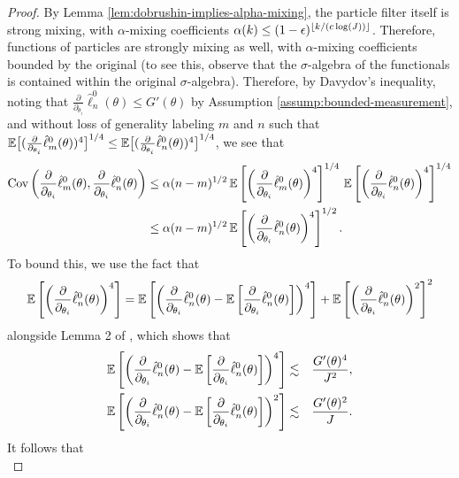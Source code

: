 \begin{proof}
By Lemma \ref{lem:dobrushin-implies-alpha-mixing}, the particle filter itself is strong mixing, with $\alpha$-mixing coefficients $\alpha(k) \leq (1-\epsilon)^{\lfloor k/(c\log(J)) \rfloor}$. Therefore, functions of particles are strongly mixing as well, with $\alpha$-mixing coefficients bounded by the original (to see this, observe that the $\sigma$-algebra of the functionals is contained within the original $\sigma$-algebra). Therefore, by Davydov's inequality, noting that $\frac{\partial}{\partial_{\theta_i}}\hat\ell_n^0(\theta)\leq G'(\theta)$ by Assumption \ref{assump:bounded-measurement}, and without loss of generality labeling $m$ and $n$ such that $\mathbb{E}\big[(\frac{\partial}{\partial_{\theta_i}}\hat\ell_m^0(\theta))^4\big]^{1/4}\leq\mathbb{E}\big[(\frac{\partial}{\partial_{\theta_i}}\hat\ell_n^0(\theta))^4\big]^{1/4}$, we see that
\begin{align}
    \mathrm{Cov}\left(\frac{\partial}{\partial_{\theta_i}}\hat\ell_m^0(\theta), \frac{\partial}{\partial_{\theta_i}}\hat\ell_n^0(\theta)\right) 
    &\leq \alpha(n-m)^{1/2} \, \mathbb{E}\left[\left(\frac{\partial}{\partial_{\theta_i}}\hat\ell_m^0(\theta)\right)^4\right]^{1/4}
    \,
    \mathbb{E}\left[\left(\frac{\partial}{\partial_{\theta_i}}\hat\ell_n^0(\theta)\right)^4\right]^{1/4}\\
    &\leq \alpha(n-m)^{1/2}\, \mathbb{E}\left[\left(\frac{\partial}{\partial_{\theta_i}}\hat\ell_n^0(\theta)\right)^4\right]^{1/2}.
\end{align}
To bound this, we use the fact that 
\begin{equation}
\mathbb{E}\left[\left(\frac{\partial}{\partial_{\theta_i}}\hat\ell_n^0(\theta)\right)^4\right] = \mathbb{E}\left[\left(\frac{\partial}{\partial_{\theta_i}}\hat\ell_n^0(\theta)-\mathbb{E}\left[\frac{\partial}{\partial_{\theta_i}}\hat\ell_n^0(\theta)\right]\right)^4\right]+\mathbb{E}\left[\left(\frac{\partial}{\partial_{\theta_i}}\hat\ell_n^0(\theta)\right)^2\right]^2
\end{equation}
alongside Lemma 2 of \cite{karjalainen23}, which shows that
\begin{eqnarray}
\mathbb{E}\left[\left(\frac{\partial}{\partial_{\theta_i}}\hat\ell_n^0(\theta)-\mathbb{E}\left[\frac{\partial}{\partial_{\theta_i}}\hat\ell_n^0(\theta)\right]\right)^4\right] &\lesssim& \frac{G'(\theta)^4}{J^2}, 
\\
\mathbb{E}\left[\left(\frac{\partial}{\partial_{\theta_i}}\hat\ell_n^0(\theta)-\mathbb{E}\left[\frac{\partial}{\partial_{\theta_i}}\hat\ell_n^0(\theta)\right]\right)^2\right] &\lesssim& \frac{G'(\theta)^2}{J}.
\end{eqnarray}
It follows that 
\begin{equation}

\end{equation}
\end{proof}
